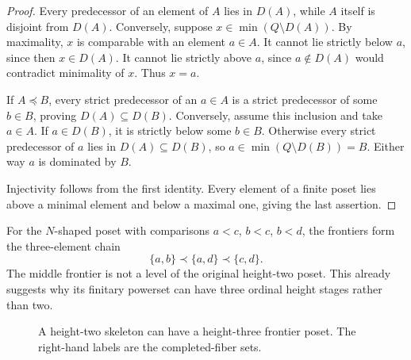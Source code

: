 \documentclass[11pt,a4paper]{article}
\theoremstyle{definition}
\theoremstyle{remark}
\newcommand{\M}{\mathcal M}
\begin{document}
\begin{proof}
Every predecessor of an element of $A$ lies in $D(A)$, while $A$ itself is
disjoint from $D(A)$. Conversely, suppose $x\in\min(Q\setminus D(A))$.
By maximality, $x$ is comparable with an element $a\in A$. It cannot lie
strictly below $a$, since then $x\in D(A)$. It cannot lie strictly above
$a$, since $a\notin D(A)$ would contradict minimality of $x$. Thus $x=a$.

If $A\preceq B$, every strict predecessor of an $a\in A$ is a strict
predecessor of some $b\in B$, proving $D(A)\subseteq D(B)$. Conversely,
assume this inclusion and take $a\in A$. If $a\in D(B)$, it is strictly
below some $b\in B$. Otherwise every strict predecessor of $a$ lies in
$D(A)\subseteq D(B)$, so $a\in\min(Q\setminus D(B))=B$. Either way $a$
is dominated by $B$.

Injectivity follows from the first identity. Every element of a finite
poset lies above a minimal element and below a maximal one, giving the
last assertion.
\end{proof}

For the $N$-shaped poset with comparisons $a<c$, $b<c$, $b<d$, the
frontiers form the three-element chain
\begin{equation}\label{eq:Nfrontiers}
 \{a,b\}\prec\{a,d\}\prec\{c,d\}.
\end{equation}
The middle frontier is not a level of the original height-two poset.
This already suggests why its finitary powerset can have three ordinal
height stages rather than two.

\begin{figure}[htbp]
\centering
{}
\caption{A height-two skeleton can have a height-three frontier poset.
The right-hand labels are the completed-fiber sets.}
\label{fig:N}
\end{figure}
\end{document}
